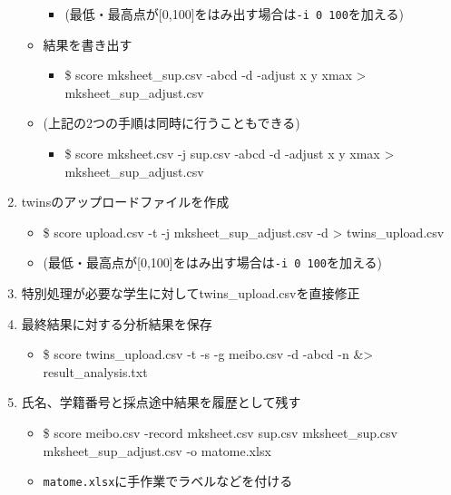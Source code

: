 \begin{enumerate}
\begin{itemize}
\begin{itemize}
\item (最低・最高点が{[0,100]}をはみ出す場合は\texttt{-i 0 100}を加える)

\end{itemize}

\item 結果を書き出す

\begin{itemize}
\item \$ score mksheet\_sup.csv -abcd -d -adjust x y xmax > mksheet\_sup\_adjust.csv

\end{itemize}

\item (上記の2つの手順は同時に行うこともできる)

\begin{itemize}
\item \$ score mksheet.csv -j sup.csv -abcd -d -adjust x y xmax > mksheet\_sup\_adjust.csv

\end{itemize}

\end{itemize}

\item twinsのアップロードファイルを作成

\begin{itemize}
\item \$ score upload.csv -t -j mksheet\_sup\_adjust.csv -d > twins\_upload.csv

\item (最低・最高点が{[0,100]}をはみ出す場合は\texttt{-i 0 100}を加える)

\end{itemize}

\item 特別処理が必要な学生に対してtwins\_upload.csvを直接修正

\item 最終結果に対する分析結果を保存

\begin{itemize}
\item \$ score twins\_upload.csv -t -s -g meibo.csv -d -abcd -n \&> result\_analysis.txt

\end{itemize}

\item 氏名、学籍番号と採点途中結果を履歴として残す

\begin{itemize}
\item \$ score meibo.csv -record mksheet.csv sup.csv mksheet\_sup.csv mksheet\_sup\_adjust.csv -o matome.xlsx

\item \texttt{matome.xlsx}に手作業でラベルなどを付ける

\end{itemize}

\end{enumerate}

